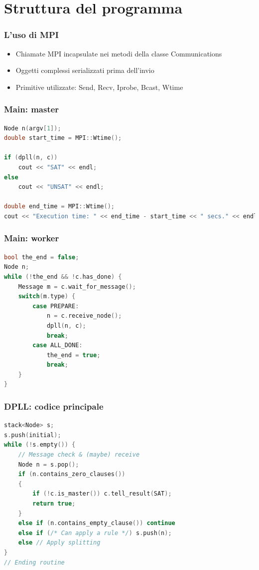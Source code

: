 \documentclass[12pt,xcolor=dvipsnames]{beamer}
\begin{document}
\section{Struttura del programma}

\begin{frame}
    \frametitle{L'uso di MPI}
    \begin{itemize}
     \item Chiamate MPI incapsulate nei metodi della classe Communications \pause
     \item Oggetti complessi serializzati prima dell'invio \pause
     \item Primitive utilizzate: Send, Recv, Iprobe, Bcast, Wtime
    \end{itemize}
\end{frame}

\begin{frame}[fragile]
    \frametitle{Main: master}
\begin{lstlisting}[language=c++]
Node n(argv[1]);
double start_time = MPI::Wtime();

if (dpll(n, c))
    cout << "SAT" << endl;
else
    cout << "UNSAT" << endl;

double end_time = MPI::Wtime();
cout << "Execution time: " << end_time - start_time << " secs." << endl;
\end{lstlisting}
\end{frame}

\begin{frame}[fragile]
    \frametitle{Main: worker}
\begin{lstlisting}[language=c++]
bool the_end = false;
Node n;
while (!the_end && !c.has_done) {
    Message m = c.wait_for_message();
    switch(m.type) {
        case PREPARE:
            n = c.receive_node();
            dpll(n, c);
            break;
        case ALL_DONE:
            the_end = true;
            break;
    }
}
\end{lstlisting}
\end{frame}

\begin{frame}[fragile]
    \frametitle{DPLL: codice principale}
\begin{lstlisting}[language=c++]
stack<Node> s;
s.push(initial);
while (!s.empty()) {
    // Message check & (maybe) receive
    Node n = s.pop();
    if (n.contains_zero_clauses())
    {
        if (!c.is_master()) c.tell_result(SAT);
        return true;
    }
    else if (n.contains_empty_clause()) continue
    else if (/* Can apply a rule */) s.push(n);
    else // Apply splitting
}
// Ending routine
\end{lstlisting}
\end{frame}
\end{document}
